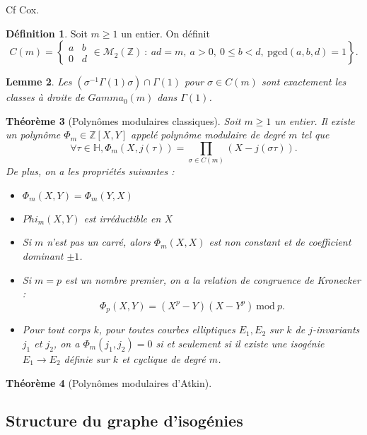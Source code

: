 \documentclass[11pt,a4paper]{article}
\newcommand{\Z}{\mathbb{Z}}
\renewcommand{\H}{\mathbb{H}}
\newcommand{\M}{\mathcal{M}}
\newcommand{\vers}{\rightarrow}
\newtheorem{thm}{Théorème}[subsection]
\newtheorem{lem}[thm]{Lemme}
\theoremstyle{definition}
\newtheorem{defi}[thm]{Définition}
\begin{document}
Cf Cox.

\begin{defi}
Soit $m\geq 1$ un entier. On définit
$$C(m)=\left\{ 
\begin{matrix}
a & b \\
0 & d 
\end{matrix}
\in \M_2(\Z)\ :\ ad=m,\ a>0,\ 0\leq b<d,\ \mathrm{pgcd}(a,b,d)=1\right\}.$$
\end{defi}

\begin{lem}
Les $(\sigma^{-1}\Gamma(1)\sigma)\cap \Gamma(1)$ pour $\sigma\in C(m)$ sont exactement les classes à droite de $Gamma_0(m)$ dans $\Gamma(1)$.
\end{lem}

\begin{thm}[Polynômes modulaires classiques]

Soit $m\geq 1$ un entier. Il existe un polynôme $\Phi_m \in \Z[X,Y]$ appelé \emph{polynôme modulaire} de degré $m$ tel que
$$\forall \tau\in\H, \Phi_m(X,j(\tau))=\prod_{\sigma\in C(m)} (X-j(\sigma\tau)).$$
De plus, on a les propriétés suivantes :

\begin{itemize}
\item[(i)] $\Phi_m(X,Y)=\Phi_m(Y,X)$
\item[(ii)] $Phi_m(X,Y)$ est irréductible en $X$
\item[(iii)] Si $m$ n'est pas un carré, alors $\Phi_m(X,X)$ est non constant et de coefficient dominant $\pm 1$.
\item[(iv)] Si $m=p$ est un nombre premier, on a la \emph{relation de congruence de Kronecker} :
$$\Phi_p(X,Y) = (X^p-Y)(X-Y^p) \: \mathrm{mod}\ p.$$
\item[(v)] Pour tout corps $k$, pour toutes courbes elliptiques $E_1,E_2$ sur $k$ de $j$-invariants $j_1$ et $j_2$, on a $\Phi_m(j_1,j_2)=0$ si et seulement si il existe une isogénie $E_1 \vers E_2$ définie sur $k$ et cyclique de degré $m$.
\end{itemize}

\end{thm}

\begin{thm}[Polynômes modulaires d'Atkin]

\end{thm}

\subsection{Structure du graphe d'isogénies}
\end{document}
